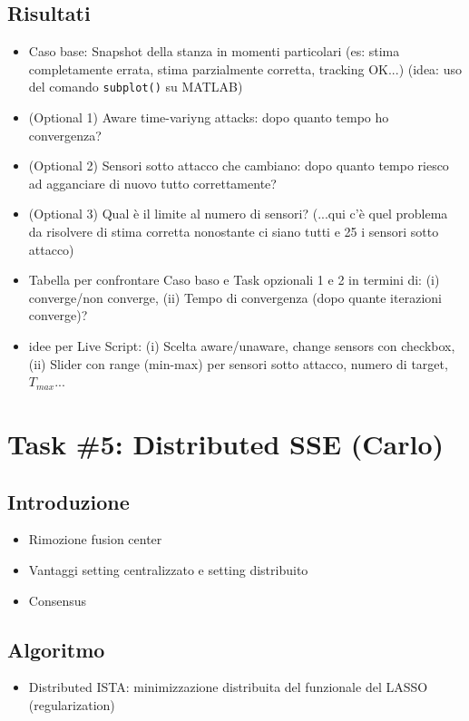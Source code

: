 \subsection*{Risultati}
\begin{itemize}
    \item Caso base: Snapshot della stanza in momenti particolari (es: stima completamente errata, stima parzialmente corretta, tracking OK...) \textsf{
        (idea: uso del comando \texttt{subplot()} su MATLAB)
    }
    \item (Optional 1) Aware time-variyng attacks: dopo quanto tempo ho convergenza?
    \item (Optional 2) Sensori sotto attacco che cambiano: dopo quanto tempo riesco ad agganciare di nuovo tutto correttamente?
    \item (Optional 3) Qual \`e il limite al numero di sensori? (...qui c'\`e quel problema da risolvere di stima corretta nonostante ci siano tutti e 25 i sensori sotto attacco)
    \item Tabella per confrontare Caso baso e Task opzionali 1 e 2 in termini di: (i) converge/non converge, (ii) Tempo di convergenza (dopo quante iterazioni converge)?
    \item \textsf{idee per Live Script: (i) Scelta aware/unaware, change sensors con checkbox, (ii) Slider con range (min-max) per sensori sotto attacco, numero di target, $T_{max}$...}
\end{itemize}

\section*{Task \#5: Distributed SSE (Carlo)}
\subsection*{Introduzione}
\begin{itemize}
    \item Rimozione fusion center
    \item Vantaggi setting centralizzato e setting distribuito
    \item Consensus
\end{itemize}

\subsection*{Algoritmo}
\begin{itemize}
    \item Distributed ISTA: minimizzazione distribuita del funzionale del LASSO (regularization)
\end{itemize}
